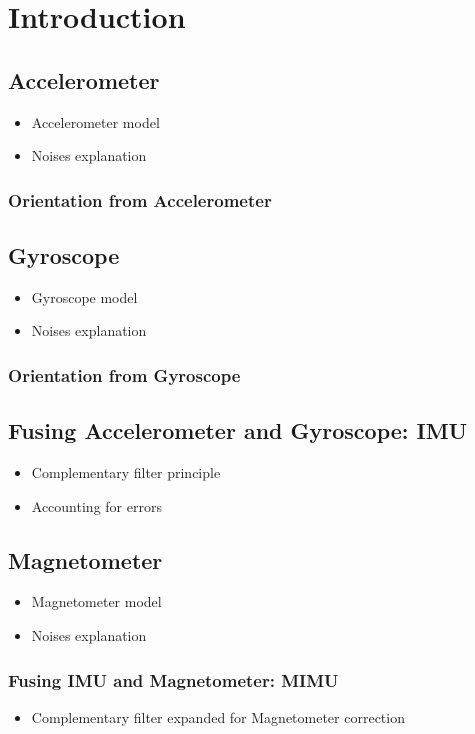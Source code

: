 \section{Introduction}

\subsection{Accelerometer}
\begin{itemize}
    \item Accelerometer model
    \item Noises explanation
\end{itemize}

\subsubsection{Orientation from Accelerometer}

\subsection{Gyroscope}
\begin{itemize}
    \item Gyroscope model
    \item Noises explanation
\end{itemize}

\subsubsection{Orientation from Gyroscope}

\subsection{Fusing Accelerometer and Gyroscope: IMU}
\begin{itemize}
    \item Complementary filter principle
    \item Accounting for errors
\end{itemize}


\subsection{Magnetometer}
\begin{itemize}
    \item Magnetometer model
    \item Noises explanation
\end{itemize}

\subsubsection{Fusing IMU and Magnetometer: MIMU}
\begin{itemize}
    \item Complementary filter expanded for Magnetometer correction
\end{itemize}